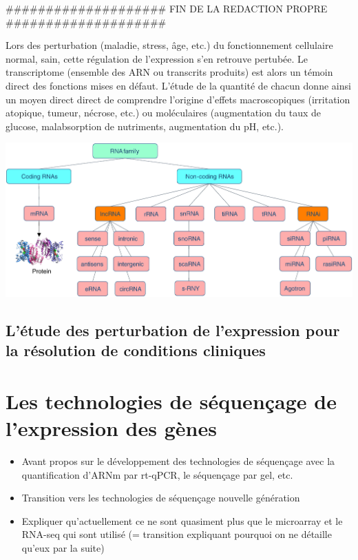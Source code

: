\#\#\#\#\#\#\#\#\#\#\#\#\#\#\#\#\#\#\#\# FIN DE LA REDACTION PROPRE  \#\#\#\#\#\#\#\#\#\#\#\#\#\#\#\#\#\#\#\#




Lors des perturbation (maladie, stress, âge, etc.) du fonctionnement cellulaire normal, sain, cette régulation de l'expression s'en retrouve pertubée. Le transcriptome (ensemble des ARN ou transcrits produits) est alors un témoin direct des fonctions mises en défaut. L'étude de la quantité de chacun donne ainsi un moyen direct direct de comprendre l'origine d'effets macroscopiques (irritation atopique, tumeur, nécrose, etc.) ou moléculaires (augmentation du taux de glucose, malabsorption de nutriments, augmentation du pH, etc.).

\includegraphics{img/intro/rna_familly_tree.jpg}


\subsection{L'étude des perturbation de l'expression pour la résolution de conditions cliniques}

\section{Les technologies de séquençage de l'expression des gènes}



\begin{itemize}
\item Avant propos sur le développement des technologies de séquençage avec la quantification d'ARNm par rt-qPCR, le séquençage par gel, etc.
\item Transition vers les technologies de séquençage nouvelle génération
\item Expliquer qu'actuellement ce ne sont quasiment plus que le microarray et le RNA-seq qui sont utilisé (= transition expliquant pourquoi on ne détaille qu'eux par la suite)
\end{itemize}

